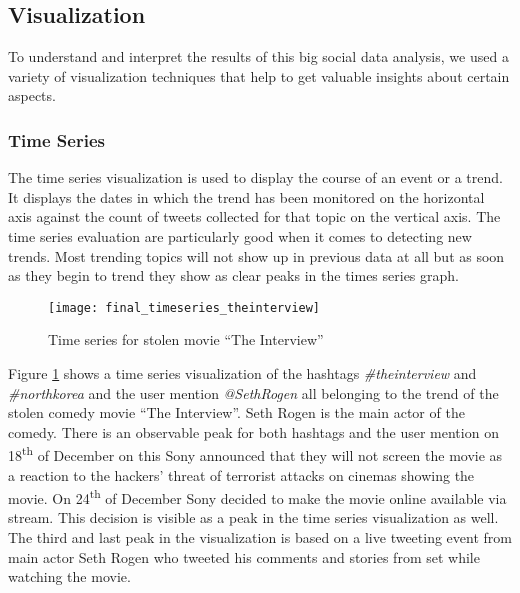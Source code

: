 \subsection{Visualization}
\label{subsec:visualization}
To understand and interpret the results of this big social data analysis, we used a variety of visualization techniques that help to get valuable insights about certain aspects.

\subsubsection{Time Series}
\label{subsubsec:vis-time-series}
The time series visualization is used to display the course of an event or a trend. It displays the dates in which the trend has been monitored on the horizontal axis against the count of tweets collected for that topic on the vertical axis. The time series evaluation are particularly good when it comes to detecting new trends. Most trending topics will not show up in previous data at all but as soon as they begin to trend they show as clear peaks in the times series graph.

\begin{figure}[H]
  \centering
        \texttt{[image: final\_timeseries\_theinterview]}
  \caption[Time series for stolen movie \enquote{The Interview}]{Time series for stolen movie \enquote{The Interview}}
  \label{fig:time-series-interview}
  \vspace{-1.3em}
\end{figure}

Figure \ref{fig:time-series-interview} shows a time series visualization of the hashtags \textit{\#theinterview} and \textit{\#northkorea} and the user mention \textit{@SethRogen} all belonging to the trend of the stolen comedy movie \enquote{The Interview}. Seth Rogen is the main actor of the comedy. There is an observable peak for both hashtags and the user mention on 18\textsuperscript{th} of December on this Sony announced that they will not screen the movie as a reaction to the hackers' threat of terrorist attacks on cinemas showing the movie. On 24\textsuperscript{th} of December Sony decided to make the movie online available via stream. This decision is visible as a peak in the time series visualization as well. The third and last peak in the visualization is based on a live tweeting event from main actor Seth Rogen who tweeted his comments and stories from set while watching the movie. \cite{deadline2014interview}

